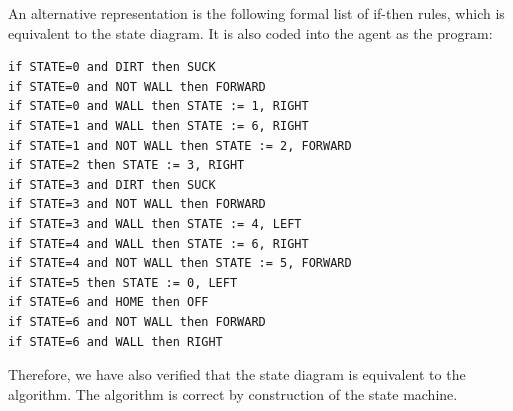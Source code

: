 An alternative representation is the following formal list of if-then rules, which is equivalent to the state diagram. It is also coded into the agent as the program:

\begin{verbatim}
if STATE=0 and DIRT then SUCK
if STATE=0 and NOT WALL then FORWARD
if STATE=0 and WALL then STATE := 1, RIGHT
if STATE=1 and WALL then STATE := 6, RIGHT
if STATE=1 and NOT WALL then STATE := 2, FORWARD
if STATE=2 then STATE := 3, RIGHT
if STATE=3 and DIRT then SUCK
if STATE=3 and NOT WALL then FORWARD
if STATE=3 and WALL then STATE := 4, LEFT
if STATE=4 and WALL then STATE := 6, RIGHT
if STATE=4 and NOT WALL then STATE := 5, FORWARD
if STATE=5 then STATE := 0, LEFT
if STATE=6 and HOME then OFF
if STATE=6 and NOT WALL then FORWARD
if STATE=6 and WALL then RIGHT
\end{verbatim}

Therefore, we have also verified that the state diagram is equivalent to the algorithm. The algorithm is correct by construction of the state machine.
